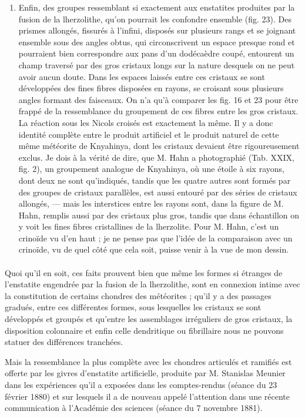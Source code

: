 \documentclass[a4paper, 12pt, oneside, french]{book}
\begin{document}
\begin{enumerate}
\item Enfin, des groupes ressemblant si exactement aux enstatites produites par la fusion de la lherzolithe, qu'on pourrait les confondre ensemble (fig. 23). Des prismes allongés, fissurés à l'infini, disposés sur plusieurs rangs et se joignant ensemble sous des angles obtus, qui circonscrivent un espace presque rond et pourraient bien correspondre aux pans d'un dodécaèdre coupé, entourent un champ traversé par des gros cristaux longs sur la nature desquels on ne peut avoir aucun doute. Dans les espaces laissés entre ces cristaux se sont développées des fines fibres disposées en rayons, se croisant sous plusieurs angles formant des faisceaux. On n'a qu'à comparer les fig. 16 et 23 pour être frappé de la ressemblance du groupement de ces fibres entre les gros cristaux. La réaction sous les Nicols croisés est exactement la même. Il y a donc identité complète entre le produit artificiel et le produit naturel de cette même météorite de Knyahinya, dont les cristaux devaient être rigoureusement exclus. Je dois à la vérité de dire, que M. Hahn a photographié (Tab. XXIX, fig. 2), un groupement analogue de Knyahinya, où une étoile à six rayons, dont deux ne sont qu'indiqués, tandis que les quatre autres sont formés par des groupes de cristaux parallèles, est aussi entouré par des séries de cristaux allongés, --- mais les interstices entre les rayons sont, dans la figure de M. Hahn, remplis aussi par des cristaux plus gros, tandis que dans échantillon on y voit les fines fibres cristallines de la lherzolite. Pour M. Hahn, c'est un crinoïde vu d'en haut ; je ne pense pas que l'idée de la comparaison avec un crinoïde, vu de quel côté que cela soit, puisse venir à la vue de mon dessin.
\end{enumerate}
\paragraph{}
Quoi qu'il en soit, ces faits prouvent bien que même les formes si étranges de l'enstatite engendrée par la fusion de la lherzolithe, sont en connexion intime avec la constitution de certains chondres des météorites ; qu'il y a des passages gradués, entre ces différentes formes, sous lesquelles les cristaux se sont développés et groupés et qu'entre les assemblages irréguliers de gros cristaux, la disposition colonnaire et enfin celle dendritique ou fibrillaire nous ne pouvons statuer des différences tranchées.

Mais la ressemblance la plus complète avec les chondres articulés et ramifiés est offerte par les givres d'enstatite artificielle, produite par M. Stanislas Meunier dans les expériences qu'il a exposées dans les comptes-rendus (séance du 23 février 1880) et sur lesquels il a de nouveau appelé l'attention dans une récente communication à l'Académie des sciences (séance du 7 novembre 1881).
\end{document}
